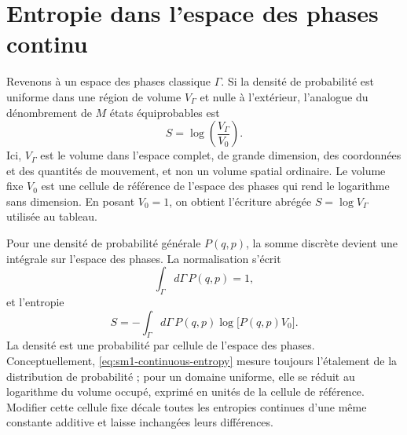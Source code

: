 \begin{classroomqa}
\end{classroomqa}

\section{Entropie dans l’espace des phases continu}

Revenons à un espace des phases classique \(\Gamma\). Si la densité de probabilité est uniforme dans une région de volume \(V_\Gamma\) et nulle à l’extérieur, l’analogue du dénombrement de \(M\) états équiprobables est
\begin{equation}
 S=\log\!\left(\frac{V_\Gamma}{V_0}\right).
 \label{eq:sm1-continuous-uniform}
\end{equation}
Ici, \(V_\Gamma\) est le volume dans l’espace complet, de grande dimension, des coordonnées et des quantités de mouvement, et non un volume spatial ordinaire. Le volume fixe \(V_0\) est une cellule de référence de l’espace des phases qui rend le logarithme sans dimension. En posant \(V_0=1\), on obtient l’écriture abrégée \(S=\log V_\Gamma\) utilisée au tableau.

Pour une densité de probabilité générale \(P(q,p)\), la somme discrète devient une intégrale sur l’espace des phases. La normalisation s’écrit
\begin{equation}
 \int_\Gamma d\Gamma\,P(q,p)=1,
 \label{eq:sm1-continuous-normalization}
\end{equation}
et l’entropie
\begin{equation}
 S=-\int_\Gamma d\Gamma\,
 P(q,p)\log\!\bigl[P(q,p)V_0\bigr].
 \label{eq:sm1-continuous-entropy}
\end{equation}
La densité est une probabilité par cellule de l’espace des phases. Conceptuellement,
\eqref{eq:sm1-continuous-entropy} mesure toujours l’étalement de la distribution de probabilité ; pour un domaine uniforme, elle se réduit au logarithme du volume occupé, exprimé en unités de la cellule de référence. Modifier cette cellule fixe décale toutes les entropies continues d’une même constante additive et laisse inchangées leurs différences.

